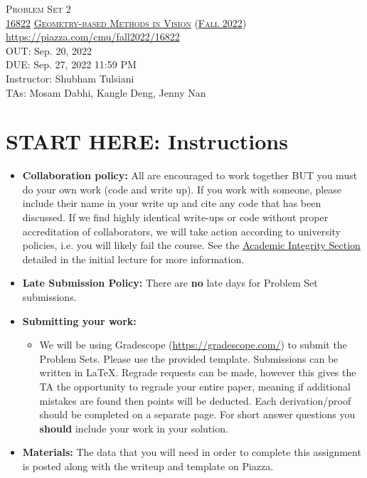 \documentclass[11pt,addpoints,answers]{exam}
\title{\textsc{\hwName}} %
\author{}
\date{}
\date{}
\numberwithin{equation}{section} %
\numberwithin{figure}{section} %
\numberwithin{table}{section} %
\newcommand{\courseNum}{\href{https://geometric3d.github.io}{16822}}
\newcommand{\courseName}{\href{https://geometric3d.github.io}{Geometry-based Methods in Vision}}
\newcommand{\courseSem}{\href{https://geometric3d.github.io}{Fall 2022}}
\newcommand{\courseUrl}{\url{https://piazza.com/cmu/fall2022/16822}}
\newcommand{\hwNum}{Problem Set 2}
\newcommand{\hwTopic}{Projective Geometry and Homography }
\newcommand{\outDate}{Sep. 20, 2022}
\newcommand{\dueDate}{Sep. 27, 2022 11:59 PM}
\newcommand{\instructorName}{Shubham Tulsiani}
\newcommand{\taNames}{Mosam Dabhi, Kangle Deng, Jenny Nan}
\begin{document}
\section*{}
\begin{center}
  \textsc{\LARGE \hwNum} \\
  \vspace{1em}
  \textsc{\large \courseNum{} \courseName{} (\courseSem)} \\
  \courseUrl\\
  \vspace{1em}
  OUT: \outDate \\
  DUE: \dueDate \\
  Instructor: \instructorName \\
  TAs: \taNames
\end{center}

\section*{START HERE: Instructions}
\begin{itemize}
\item \textbf{Collaboration policy:} All are encouraged to work together BUT you must do your own work (code and write up). If you work with someone, please include their name in your write up and cite any code that has been discussed. If we find highly identical write-ups or code without proper accreditation of collaborators, we will take action according to university policies, i.e. you will likely fail the course. See the \href{https://www.dropbox.com/s/z6o0tinc9eaez46/L01_Overview.pdf?dl=0}{Academic Integrity Section} detailed in the initial lecture for more information.

\item\textbf{Late Submission Policy:} There are \textbf{no} late days for Problem Set submissions.

\item\textbf{Submitting your work:}

\begin{itemize}

\item We will be using Gradescope (\url{https://gradescope.com/}) to submit the Problem Sets. Please use the provided template. Submissions can be written in LaTeX. Regrade requests can be made, however this gives the TA the opportunity to regrade your entire paper, meaning if additional mistakes are found then points will be deducted.
Each derivation/proof should be  completed on a separate page. For short answer questions you \textbf{should} include your work in your solution.  
\end{itemize}

\item \textbf{Materials:} The data that you will need in order to complete this assignment is posted along with the writeup and template on Piazza.

\end{itemize}
\end{document}
